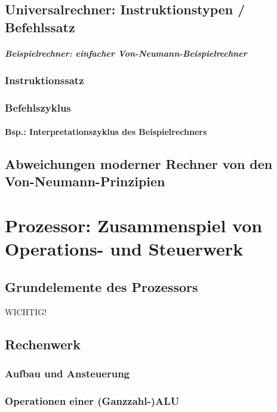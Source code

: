 \section{Universalrechner: Instruktionstypen / Befehlssatz}

\paragraph{Beispielrechner: einfacher Von-Neumann-Beispielrechner}

\subsection{Instruktionssatz}

\subsection{Befehlszyklus}

\subsubsection*{Bsp.: Interpretationszyklus des Beispielrechners}

\section{Abweichungen moderner Rechner von den Von-Neumann-Prinzipien}

\chapter{Prozessor: Zusammenspiel von Operations- und Steuerwerk}
\section*{Grundelemente des Prozessors} WICHTIG!
\section{Rechenwerk}
\subsection*{Aufbau und Ansteuerung}
\subsection*{Operationen einer (Ganzzahl-)ALU}

